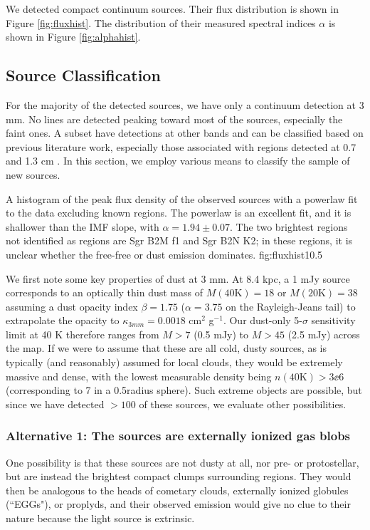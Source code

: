\documentclass[twocolumn]{aastex61}
\begin{document}
We detected \ncores compact continuum sources.  Their flux distribution is
shown in Figure \ref{fig:fluxhist}.  The distribution of their measured
spectral indices $\alpha$ is shown in Figure \ref{fig:alphahist}.


\subsection{Source Classification}
\label{sec:classification}
For the majority of the detected sources, we have only a continuum detection at
3 mm.  No lines are detected peaking toward most of the sources, especially the
faint ones.  A subset have detections at other bands and can be classified
based on previous literature work, especially those associated with \hii
regions detected at 0.7 and 1.3 cm
\citep{Gaume1995a,Mehringer1995b,de-Pree1996a,Pree2015a}.  In this section, we
employ various means to classify the sample of new sources.

{A histogram of the peak flux density of the observed sources with a powerlaw
fit to the data excluding known \hii regions.  The powerlaw is an excellent
fit, and it is shallower than the IMF slope, with $\alpha=1.94\pm0.07$.  The
two brightest regions not identified as \hii regions are Sgr B2M f1 and Sgr B2N
K2; in these regions, it is unclear whether the free-free or dust emission
dominates.}
{fig:fluxhist}{1}{0.5\textwidth}

We first note some key properties of dust at 3 mm.   At 8.4 kpc, a 1 mJy source
corresponds to an optically thin dust mass of $M(40\mathrm{K})=18$ \msun or
$M(20\mathrm{K})=38$ \msun assuming a dust opacity index $\beta=1.75$
($\alpha=3.75$ on the Rayleigh-Jeans tail) to
extrapolate the \citet{Ossenkopf1994a} opacity to $\kappa_{3mm}=0.0018$ cm$^2$
g$^{-1}$.  Our dust-only 5-$\sigma$ sensitivity limit at 40 K therefore ranges
from $M>7$ \msun (0.5 mJy) to $M>45$ \msun (2.5 mJy) across the map.  If we
were to assume that these are all cold, dusty sources, as is typically (and
reasonably) assumed for local clouds, they would be extremely massive and
dense, with the lowest measurable density being $n(40\mathrm{K}) > 3\ee{6}$
\percc (corresponding to 7 \msun in a 0.5\arcsec radius sphere).  Such extreme
objects are possible, but since we have detected $>100$ of these sources, we
evaluate other possibilities.


\subsubsection{Alternative 1: The sources are externally ionized gas blobs}
One possibility is that these sources are not dusty at all, nor pre- or
protostellar, but are instead the brightest compact clumps surrounding \hii
regions.  They would then be analogous to the heads of cometary clouds,
externally ionized globules (``EGGs"), or proplyds, and their observed emission
would give no clue to their nature because the light source is extrinsic.
\end{document}
